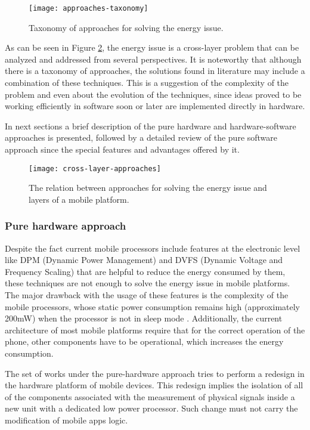 \begin{figure}
\centering
\texttt{[image: approaches-taxonomy]}
\caption[Taxonomy of approaches for solving the energy issue]{Taxonomy of approaches for solving the energy issue.}
\label{fig:approaches-taxonomy}
\end{figure}

As can be seen in Figure \ref{fig:cross-layer-approaches}, the energy issue is a cross-layer problem that can be analyzed and addressed from several perspectives.
It is noteworthy that although there is a taxonomy of approaches, the solutions found in literature may include a combination of these techniques.
This is a suggestion of the complexity of the problem and even about the evolution of the techniques, since ideas proved to be working efficiently in software soon or later are implemented directly in hardware. 

In next sections a brief description of the pure hardware and hardware-software approaches is presented, followed by a detailed review of the pure software approach since the special features and advantages offered by it.

\begin{figure}
\centering
\texttt{[image: cross-layer-approaches]}
\caption[Energy issue as an OS cross-platform problem]{The relation between approaches for solving the energy issue and layers of a mobile platform.}
\label{fig:cross-layer-approaches}
\end{figure}


\subsubsection{Pure hardware approach}

Despite the fact current mobile processors include features at the electronic level like DPM (Dynamic Power Management) and DVFS (Dynamic Voltage and Frequency Scaling) that are helpful to reduce the energy consumed by them, these techniques are not enough to solve the energy issue in mobile platforms.
The major drawback with the usage of these features is the complexity of the mobile processors, whose static power consumption remains high (approximately 200mW) when the processor is not in sleep mode \cite{Priyantha2011}.
Additionally, the current architecture of most mobile platforms require that for the correct operation of the phone, other components have to be operational, which increases the energy consumption.

The set of works under the pure-hardware approach tries to perform a redesign in the hardware platform of mobile devices.
This redesign implies the isolation of all of the components associated with the measurement of physical signals inside a new unit with a dedicated low power processor.
Such change must not carry the modification of mobile apps logic.

